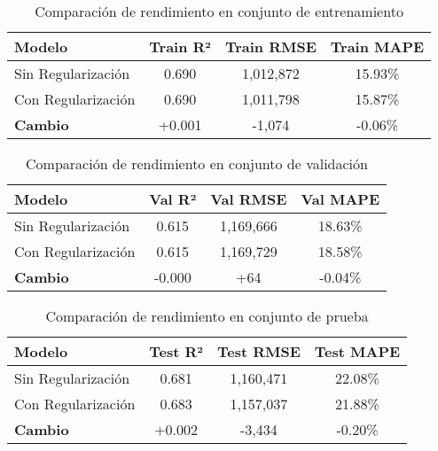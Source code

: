 \documentclass[11pt,a4paper]{article}
\begin{document}
\begin{table}[H]
    \centering
    \begin{tabular}{|l|c|c|c|}
    \hline
    \textbf{Modelo} & \textbf{Train R²} & \textbf{Train RMSE} & \textbf{Train MAPE} \\
    \hline
    Sin Regularización & 0.690 & 1,012,872 & 15.93\% \\
    Con Regularización & 0.690 & 1,011,798 & 15.87\% \\
    \hline
    \textbf{Cambio} & +0.001 & -1,074 & -0.06\% \\
    \hline
    \end{tabular}
    \caption{Comparación de rendimiento en conjunto de entrenamiento}
    \label{tab:train_comparison}
\end{table}

\begin{table}[H]
    \centering
    \begin{tabular}{|l|c|c|c|}
    \hline
    \textbf{Modelo} & \textbf{Val R²} & \textbf{Val RMSE} & \textbf{Val MAPE} \\
    \hline
    Sin Regularización & 0.615 & 1,169,666 & 18.63\% \\
    Con Regularización & 0.615 & 1,169,729 & 18.58\% \\
    \hline
    \textbf{Cambio} & -0.000 & +64 & -0.04\% \\
    \hline
    \end{tabular}
    \caption{Comparación de rendimiento en conjunto de validación}
    \label{tab:val_comparison}
\end{table}

\begin{table}[H]
    \centering
    \begin{tabular}{|l|c|c|c|}
    \hline
    \textbf{Modelo} & \textbf{Test R²} & \textbf{Test RMSE} & \textbf{Test MAPE} \\
    \hline
    Sin Regularización & 0.681 & 1,160,471 & 22.08\% \\
    Con Regularización & 0.683 & 1,157,037 & 21.88\% \\
    \hline
    \textbf{Cambio} & +0.002 & -3,434 & -0.20\% \\
    \hline
    \end{tabular}
    \caption{Comparación de rendimiento en conjunto de prueba}
    \label{tab:test_comparison}
\end{table}
\end{document}
